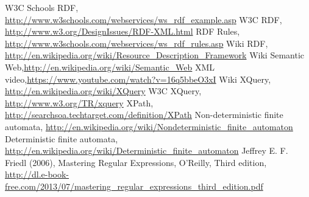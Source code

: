 \documentclass[a4paper,11pt]{report}
\begin{document}
\begin{thebibliography}{99}

W3C Schools RDF,  \url{http://www.w3schools.com/webservices/ws_rdf_example.asp}
W3C RDF, \url{http://www.w3.org/DesignIssues/RDF-XML.html}
RDF Rules, \url{http://www.w3schools.com/webservices/ws_rdf_rules.asp}
Wiki RDF, \url{http://en.wikipedia.org/wiki/Resource_Description_Framework}
Wiki Semantic Web,\url{http://en.wikipedia.org/wiki/Semantic_Web}
XML video,\url{https://www.youtube.com/watch?v=16q5bbeO3xI}
Wiki XQuery, \url{http://en.wikipedia.org/wiki/XQuery} 
W3C XQuery, \url{http://www.w3.org/TR/xquery}
XPath, \url{http://searchsoa.techtarget.com/definition/XPath}
Non-deterministic finite automata, \url{http://en.wikipedia.org/wiki/Nondeterministic_finite_automaton}
Deterministic finite automata, \url{http://en.wikipedia.org/wiki/Deterministic_finite_automaton}
Jeffrey E. F. Friedl (2006), Mastering Regular Expressions, O'Reilly, Third edition, \url{http://dl.e-book-free.com/2013/07/mastering_regular_expressions_third_edition.pdf}


\end{thebibliography}
\end{document}

